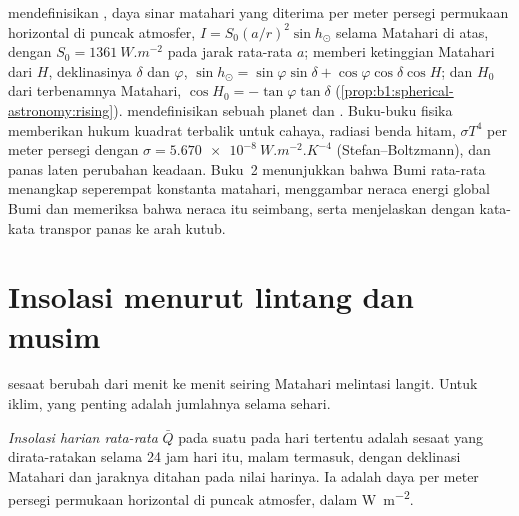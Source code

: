 \begin{recall}
 mendefinisikan , daya sinar matahari yang diterima per meter persegi permukaan horizontal di puncak atmosfer, $I = S_0(a/r)^2\sin h_\odot$ selama Matahari di atas, dengan $S_0 = \qty{1361}{W.m^{-2}}$ pada jarak rata-rata $a$; memberi ketinggian Matahari dari  $H$, deklinasinya $\delta$ dan  $\varphi$, $\sin h_\odot = \sin\varphi\sin\delta + \cos\varphi\cos\delta\cos H$; dan  $H_0$ dari terbenamnya Matahari, $\cos H_0 = -\tan\varphi\tan\delta$ (\cref{prop:b1:spherical-astronomy:rising}).  mendefinisikan  sebuah planet dan . Buku-buku fisika memberikan hukum kuadrat terbalik untuk cahaya, radiasi benda hitam, $\sigma T^4$ per meter persegi dengan $\sigma = \qty{5.670e-8}{W.m^{-2}.K^{-4}}$ (Stefan--Boltzmann), dan panas laten perubahan keadaan. Buku~2 menunjukkan bahwa Bumi rata-rata menangkap seperempat konstanta matahari, menggambar neraca energi global Bumi dan memeriksa bahwa neraca itu seimbang, serta menjelaskan dengan kata-kata transpor panas ke arah kutub.
\end{recall}

\section{Insolasi menurut lintang dan musim}\label{sec:b1:radiation-heat-transport:insolation}

 sesaat berubah dari menit ke menit seiring Matahari melintasi langit. Untuk iklim, yang penting adalah jumlahnya selama sehari.

\begin{definition}\label{def:b1:radiation-heat-transport:daily-insolation}
\emph{Insolasi harian rata-rata} $\bar Q$ pada suatu  pada hari tertentu adalah  sesaat yang dirata-ratakan selama 24 jam hari itu, malam termasuk, dengan deklinasi Matahari dan jaraknya ditahan pada nilai harinya. Ia adalah daya per meter persegi permukaan horizontal di puncak atmosfer, dalam \unit{W.m^{-2}}.
\end{definition}

